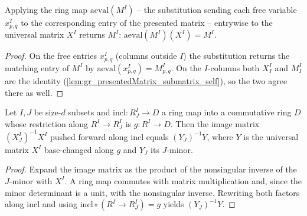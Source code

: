 \begin{lemma}\leanok
  \label{lem:gr_universalMatrix_map_presentedMatrix}
  Applying the ring map \(\mathrm{aeval}(M^I)\) -- the substitution sending each free variable
  \(x^I_{p,q}\) to the corresponding entry of the presented matrix -- entrywise to the
  universal matrix \(X^I\) returns \(M^I\): \(\mathrm{aeval}(M^I)(X^I) = M^I\).
\end{lemma}
\begin{proof}
  On the free entries \(x^I_{p,q}\) (columns outside \(I\)) the substitution returns the
  matching entry of \(M^I\) by \(\mathrm{aeval}(x^I_{p,q}) = M^I_{p,q}\). On the \(I\)-columns
  both \(X^I_I\) and \(M^I_I\) are the identity (\cref{lem:gr_presentedMatrix_submatrix_self}),
  so the two agree there as well.
\end{proof}

\begin{lemma}\leanok
  \label{lem:gr_imageMatrix_map_ringHom}
  Let \(I, J\) be size-\(d\) subsets and \(\mathrm{incl} : R^I_J \to D\) a ring map into a
  commutative ring \(D\) whose restriction along \(R^I \to R^I_J\) is \(g : R^I \to D\). Then
  the image matrix \((X^I_J)^{-1}X^I\) pushed forward along \(\mathrm{incl}\) equals
  \((Y_J)^{-1}Y\), where \(Y\) is the universal matrix \(X^I\) base-changed along \(g\) and
  \(Y_J\) its \(J\)-minor.
\end{lemma}
\begin{proof}

  Expand the image matrix as the product of the nonsingular inverse of the \(J\)-minor with
  \(X^I\). A ring map commutes with matrix multiplication and, since the minor determinant is
  a unit, with the nonsingular inverse. Rewriting both factors along \(\mathrm{incl}\) and
  using \(\mathrm{incl}\circ(R^I\to R^I_J) = g\) yields \((Y_J)^{-1}Y\).
\end{proof}

